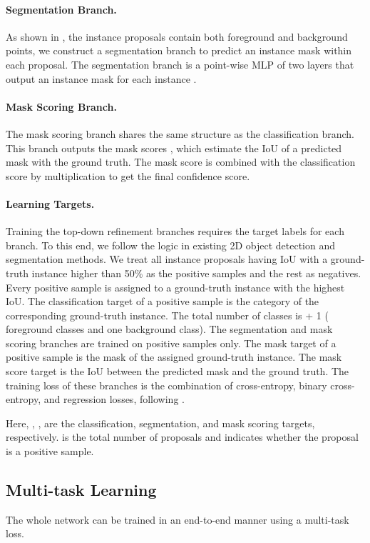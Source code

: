 \documentclass[10pt,twocolumn,letterpaper]{article}
\begin{document}
	\paragraph{Segmentation Branch.}
	As shown in , the instance proposals contain both foreground and background points, we construct a segmentation branch to predict an instance mask within each proposal. The segmentation branch is a point-wise MLP of two layers that output an instance mask   for each instance .
	
	\paragraph{Mask Scoring Branch.}
	The mask scoring branch shares the same structure as the classification branch. This branch outputs the mask scores , which estimate the IoU of a predicted mask with the ground truth. The mask score is combined with the classification score by multiplication to get the final confidence score. 
	
	\paragraph{Learning Targets.} Training the top-down refinement branches requires the target labels for each branch. To this end, we follow the logic in existing 2D object detection and segmentation methods. We treat all instance proposals having IoU with a ground-truth instance higher than 50\% as the positive samples and the rest as negatives. Every positive sample is assigned to a ground-truth instance with the highest IoU. The classification target of a positive sample is the category of the corresponding ground-truth instance. The total number of classes is  + 1 ( foreground classes and one background class). The segmentation and mask scoring branches are trained on positive samples only. The mask target of a positive sample is the mask of the assigned ground-truth instance. The mask score target is the IoU between the predicted mask and the ground truth. The training loss of these branches is the combination of cross-entropy, binary cross-entropy, and  regression losses,  following \cite{he2017mask,huang2019mask}.
	
	
	
	
	Here, , ,  are the classification, segmentation, and mask scoring targets, respectively.  is the total number of proposals and  indicates whether the proposal is a positive sample. 
	
	\subsection{Multi-task Learning}
	The whole network can be trained in an end-to-end manner using a multi-task loss.
	
\end{document}
